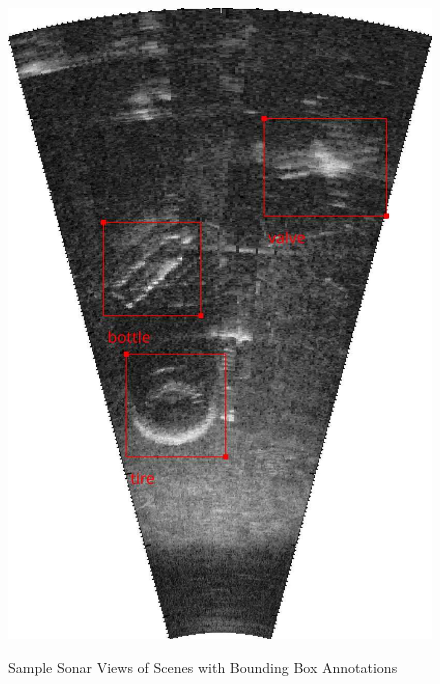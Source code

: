 \begin{figure}[t]
{        \includegraphics[height = 0.2\textheight]{chapters/images/dataset/sonar-scene-tire-bottle-valve.jpg}
    }
    \caption{Sample Sonar Views of Scenes with Bounding Box Annotations}
    \label{md:sonar-scenes}
\end{figure}

